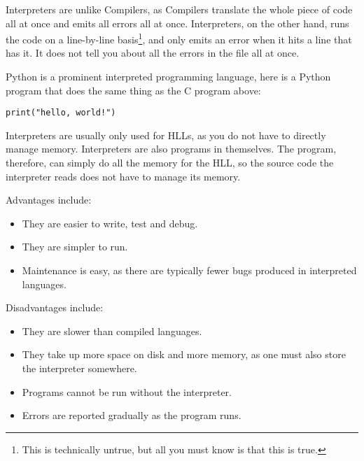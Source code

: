 \documentclass[../main.tex]{subfiles}
\begin{document}
Interpreters are unlike Compilers, as Compilers translate the whole piece of code all at once and emits all errors all at once. Interpreters, on the other hand, runs the code on a line-by-line basis\footnote{This is technically untrue, but all you must know is that this is true.}, and only emits an error when it hits a line that has it. It does not tell you about all the errors in the file all at once.

Python is a prominent interpreted programming language, here is a Python program that does the same thing as the C program above:

\begin{verbatim}
print("hello, world!")
\end{verbatim}

Interpreters are usually only used for HLLs, as you do not have to directly manage memory. Interpreters are also programs in themselves. The program, therefore, can simply do all the memory for the HLL, so the source code the interpreter reads does not have to manage its memory.

Advantages include:

\begin{itemize}
    \item They are easier to write, test and debug.
    \item They are simpler to run.
    \item Maintenance is easy, as there are typically fewer bugs produced in interpreted languages.
\end{itemize}

Disadvantages include:

\begin{itemize}
    \item They are slower than compiled languages.
    \item They take up more space on disk and more memory, as one must also store the interpreter somewhere.
    \item Programs cannot be run without the interpreter.
    \item Errors are reported gradually as the program runs.
\end{itemize}
\end{document}
